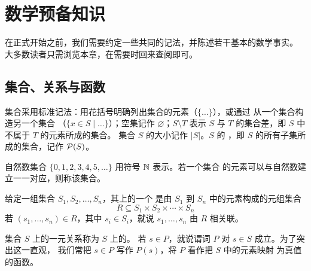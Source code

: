 
\chapter{数学预备知识}
\label{chap:2}

在正式开始之前，我们需要约定一些共同的记法，并陈述若干基本的数学事实。
大多数读者只需浏览本章，在需要时回来查阅即可。

\section{集合、关系与函数}
\label{sec:2.1}

\begin{definition}
\label{def:2.1.1}
集合采用标准记法：用花括号明确列出集合的元素（\(\{\ldots\}\)），或通过
从一个集合构造另一个集合
（\(\{x\in S\mid\ldots\}\)）；空集记作 \(\varnothing\)；\(S\setminus T\)
表示 \(S\) 与 \(T\) 的集合差，即 \(S\) 中不属于 \(T\) 的元素所成的集合。
集合 \(S\) 的大小记作 \(\lvert S\rvert\)。\(S\) 的
，即 \(S\) 的所有子集所成的集合，记作
\(\mathcal{P}(S)\)。
\end{definition}

\begin{definition}
\label{def:2.1.2}
自然数集合 \(\{0,1,2,3,4,5,\ldots\}\) 用符号 \(\mathbb{N}\) 表示。若一个集合
的元素可以与自然数建立一一对应，则称该集合。
\end{definition}

\begin{definition}
\label{def:2.1.3}
给定一组集合 \(S_1,S_2,\ldots,S_n\)，其上的一个
是由 \(S_1\) 到 \(S_n\)
中的元素构成的元组集合
\[
  R\subseteq S_1\times S_2\times\cdots\times S_n
\]
若 \((s_1,\ldots,s_n)\in R\)，其中 \(s_i\in S_i\)，就说
\(s_1,\ldots,s_n\) 由 \(R\) 相关联。
\end{definition}

\begin{definition}
\label{def:2.1.4}
集合 \(S\) 上的一元关系称为 \(S\) 上的。
若 \(s\in P\)，就说谓词 \(P\) 对 \(s\in S\) 成立。为了突出这一直观，
我们常把 \(s\in P\) 写作 \(P(s)\)，将 \(P\) 看作把 \(S\) 中的元素映射
为真值的函数。
\end{definition}

